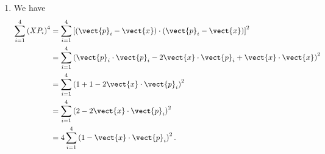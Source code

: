 \begin{enumerate}
    \item We have
          \begin{align*}
              \sum_{i = 1}^{4} \left(X P_i\right)^4 & = \sum_{i = 1}^{4} \left[\left(\vect{p}_i - \vect{x}\right) \cdot \left(\vect{p}_i - \vect{x}\right)\right]^2         \\
                                                    & = \sum_{i = 1}^{4} \left(\vect{p}_i \cdot \vect{p}_i - 2 \vect{x} \cdot \vect{p}_i + \vect{x} \cdot \vect{x}\right)^2 \\
                                                    & = \sum_{i = 1}^{4} \left(1 + 1 - 2 \vect{x} \cdot \vect{p}_i\right)^2                                                 \\
                                                    & = \sum_{i = 1}^{4} \left(2 - 2 \vect{x} \cdot \vect{p}_i\right)^2                                                     \\
                                                    & = 4 \sum_{i = 1}^{4} \left(1 - \vect{x} \cdot \vect{p}_i\right)^2.
          \end{align*}


\end{enumerate}
